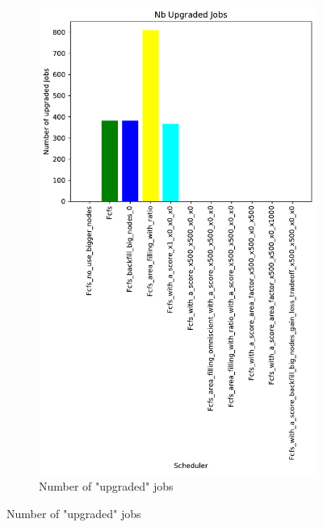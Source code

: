 \documentclass[a4paper]{article}
\begin{document}
\begin{figure}[H]
\begin{subfigure}[b]{0.4\linewidth}\centering\includegraphics[width=0.7\linewidth]{MBSS/plot/Results_Size_And_Data_2022-03-01->2022-03-03_V9532_Nb_Upgraded_Jobs_450_128_32_256_4_1024.pdf}\caption{Number of "upgraded" jobs}\label{45}\end{subfigure}

\end{figure}
\end{document}
